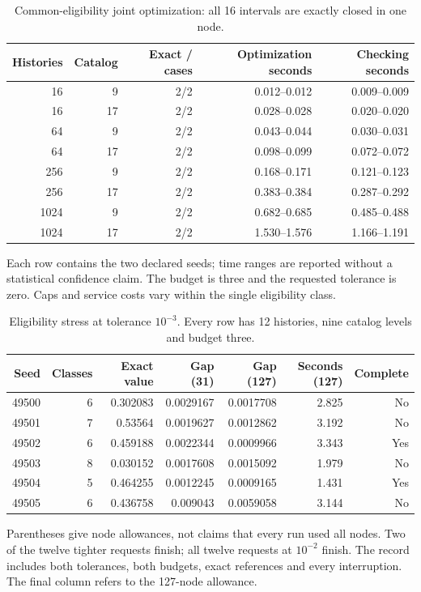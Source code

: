 \begin{table}[p]\centering
\caption{Common-eligibility joint optimization: all 16 intervals are exactly closed in one node.}\label{tab:r49-scaling}
\setlength{\tabcolsep}{3pt}
\begin{tabular}{rrrrr}\toprule
Histories & Catalog & Exact / cases & Optimization seconds & Checking seconds \\
\midrule
16 & 9 & 2/2 & 0.012--0.012 & 0.009--0.009 \\
16 & 17 & 2/2 & 0.028--0.028 & 0.020--0.020 \\
64 & 9 & 2/2 & 0.043--0.044 & 0.030--0.031 \\
64 & 17 & 2/2 & 0.098--0.099 & 0.072--0.072 \\
256 & 9 & 2/2 & 0.168--0.171 & 0.121--0.123 \\
256 & 17 & 2/2 & 0.383--0.384 & 0.287--0.292 \\
1024 & 9 & 2/2 & 0.682--0.685 & 0.485--0.488 \\
1024 & 17 & 2/2 & 1.530--1.576 & 1.166--1.191 \\
\bottomrule\end{tabular}
\par\smallskip\begin{minipage}{.98\textwidth}Each row contains the two declared seeds; time ranges are reported without a statistical confidence claim. The budget is three and the requested tolerance is zero. Caps and service costs vary within the single eligibility class.\end{minipage}
\end{table}
\begin{table}[p]\centering
\caption{Eligibility stress at tolerance $10^{-3}$. Every row has 12 histories, nine catalog levels and budget three.}\label{tab:r49-stress}
\setlength{\tabcolsep}{3pt}
\begin{tabular}{rrrrrrr}\toprule
Seed & Classes & Exact value & Gap (31) & Gap (127) & Seconds (127) & Complete \\
\midrule
49500 & 6 & 0.302083 & 0.0029167 & 0.0017708 & 2.825 & No \\
49501 & 7 & 0.53564 & 0.0019627 & 0.0012862 & 3.192 & No \\
49502 & 6 & 0.459188 & 0.0022344 & 0.0009966 & 3.343 & Yes \\
49503 & 8 & 0.030152 & 0.0017608 & 0.0015092 & 1.979 & No \\
49504 & 5 & 0.464255 & 0.0012245 & 0.0009165 & 1.431 & Yes \\
49505 & 6 & 0.436758 & 0.009043 & 0.0059058 & 3.144 & No \\
\bottomrule\end{tabular}
\par\smallskip\begin{minipage}{.98\textwidth}Parentheses give node allowances, not claims that every run used all nodes. Two of the twelve tighter requests finish; all twelve requests at $10^{-2}$ finish. The record includes both tolerances, both budgets, exact references and every interruption. The final column refers to the 127-node allowance.\end{minipage}
\end{table}
